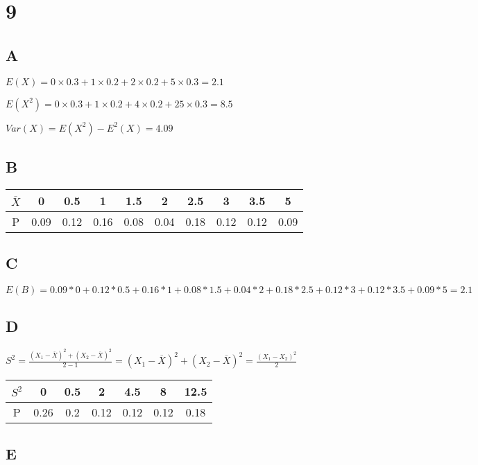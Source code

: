 \documentclass{article}
\begin{document}
	\section*{9}
	
	\subsection*{A}\noindent
	
	$E(X)=0\times 0.3+1\times 0.2+2\times 0.2+5\times 0.3=2.1$
	
	$E(X^2)=0\times 0.3+1\times 0.2+4\times 0.2+25\times 0.3=8.5$
	
	$Var(X)=E(X^2)-E^2(X)=4.09$
	
	\subsection*{B}
	
	\begin{tabular}{c|c|c|c|c|c|c|c|c|c}
   $\overline{X}$ & 0 & 0.5 & 1 & 1.5 & 2 & 2.5 & 3 & 3.5 & 5  \\
  	\hline
  	P & 0.09 & 0.12 & 0.16 & 0.08 & 0.04 & 0.18 & 0.12 & 0.12 & 0.09  \\
  	
  		\end{tabular}
	
	\subsection*{C}
	
	$E(B)=0.09*0+0.12*0.5+0.16*1+0.08*1.5+0.04*2+0.18*2.5+0.12*3+0.12*3.5+0.09*5=2.1  $
	
	\subsection*{D}
	
	$S^2=\frac{(X_1-\overline{X})^2+(X_2-\overline{X})^2}{2-1}=(X_1-\overline{X})^2+(X_2-\overline{X})^2=\frac{(X_1-X_2)^2}{2}$
	
	\begin{tabular}{c|c|c|c|c|c|c}
   $S^2$ & 0 & 0.5 & 2 & 4.5 & 8 & 12.5   \\
  	\hline
  	P &  0.26 & 0.2 & 0.12 & 0.12 & 0.12 & 0.18   \\
  	
  		\end{tabular}
	
	\subsection*{E}
	
\end{document}
